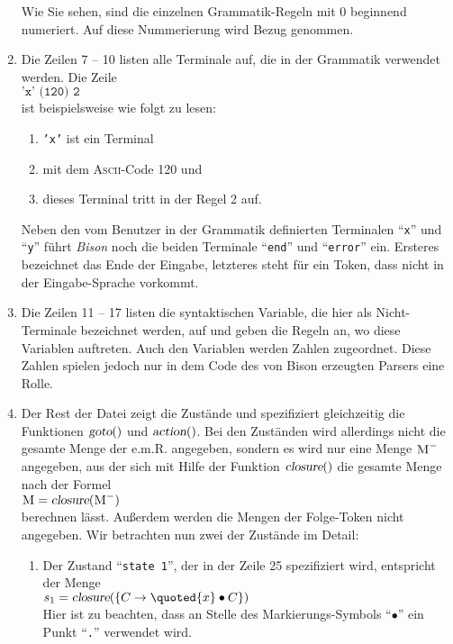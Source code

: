 \begin{enumerate}
      Wie Sie sehen, sind die einzelnen Grammatik-Regeln mit 0 beginnend numeriert.
      Auf diese Nummerierung wird  Bezug genommen.
\item Die Zeilen 7 -- 10 listen alle Terminale auf, die in der Grammatik verwendet
      werden.  Die Zeile
      \\[-0.2cm]
      \hspace*{1.3cm}
      $\texttt{'x' (120) 2}$
      \\[0.2cm]
      ist beispielsweise wie folgt zu lesen:
      \begin{enumerate}
      \item \texttt{'x'} ist ein Terminal
      \item mit dem \textsc{Ascii}-Code 120 und
      \item dieses Terminal tritt in der Regel 2 auf.
      \end{enumerate}
      Neben den vom Benutzer in der Grammatik definierten Terminalen ``\texttt{x}'' und
      ``\texttt{y}'' f\"uhrt \textsl{Bison} noch die beiden Terminale
      ``\texttt{end}'' und ``\texttt{error}'' ein.  Ersteres bezeichnet das
      Ende der Eingabe, letzteres steht f\"ur ein Token, dass nicht in der Eingabe-Sprache vorkommt.
\item Die Zeilen 11 -- 17 listen die syntaktischen Variable, die hier als Nicht-Terminale
      bezeichnet werden, auf und geben die Regeln an, wo diese Variablen auftreten.
      Auch den Variablen werden Zahlen zugeordnet.  Diese Zahlen spielen jedoch nur
      in dem Code des von Bison erzeugten Parsers eine Rolle.
\item Der Rest der Datei zeigt die Zust\"ande und spezifiziert gleichzeitig die Funktionen
      $\textsl{goto}()$ und $\textsl{action}()$.  Bei den Zust\"anden wird allerdings nicht
      die gesamte Menge der e.m.R. angegeben, sondern es wird nur eine Menge
      $\textsc{M}^-$ angegeben, aus der sich mit Hilfe der Funktion $\textsl{closure}()$
      die gesamte Menge nach der Formel
      \\[0.2cm]
      \hspace*{1.3cm}
      $\textsc{M} = \textsl{closure}(\textsc{M}^-)$
      \\[0.2cm]
      berechnen l\"asst.  Au{\ss}erdem werden die Mengen der Folge-Token nicht angegeben.
      Wir betrachten nun zwei der Zust\"ande im Detail:
      \begin{enumerate}
      \item Der Zustand ``\texttt{state 1}'', der in der Zeile 25 spezifiziert
            wird, entspricht der Menge
            \\[0.2cm]
            \hspace*{-0.8cm}
            $s_1 = \textsl{closure}(\{ C \rightarrow \quoted{x} \bullet C \})$
            \\[0.1cm]
            Hier ist zu beachten, dass an Stelle des Markierungs-Symbols ``$\bullet$''
            ein Punkt ``\texttt{.}'' verwendet wird.  
            

\end{enumerate}
\end{enumerate}
